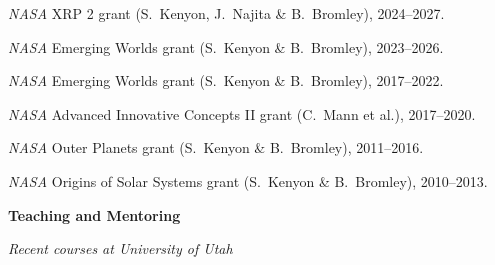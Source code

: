 \documentclass[11pt]{article}
\newcommand{\shead}[1]{\vspace{12.5pt}\centerline{{\bf{#1}}}}
\begin{document}
\begin{list}{\mbox{}}{%
\setlength{\partopsep}{0.0in}%
\setlength{\itemindent}{-0.5in}%
\setlength{\leftmargin}{1.2in}%
\setlength{\parsep}{-2.75pt}
}
\vspace{-11pt}
\item
  {\em NASA} XRP 2 grant (S.~Kenyon, J.~Najita \& B.~Bromley), 2024--2027.
 \item
  {\em NASA} Emerging Worlds grant (S.~Kenyon \& B.~Bromley), 2023--2026.
\item
  {\em NASA} Emerging Worlds grant (S.~Kenyon \& B.~Bromley), 2017--2022.
\item
  {\em NASA} Advanced Innovative Concepts II grant (C.~Mann et al.), 2017--2020.
\item
  {\em NASA} Outer Planets grant (S.~Kenyon \& B.~Bromley), 2011--2016.
\item
 {\em NASA} Origins of Solar Systems grant (S.~Kenyon \& B.~Bromley), 2010--2013.
\end{list}

\vspace{-11pt}

\shead{Teaching and Mentoring}

\vspace{5.5pt}
\centerline{\em Recent courses at University of Utah}
\end{document}
